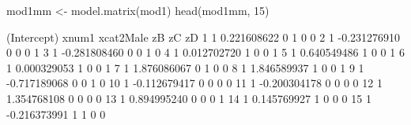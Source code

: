 \begin{Schunk}
\begin{Sinput}
 mod1mm <- model.matrix(mod1)
 head(mod1mm, 15)
\end{Sinput}
\begin{Soutput}
   (Intercept)        xnum1 xcat2Male zB zC zD
1            1  0.221608622         0  1  0  0
2            1 -0.231276910         0  0  0  1
3            1 -0.281808460         0  0  1  0
4            1  0.012702720         1  0  0  1
5            1  0.640549486         1  0  0  1
6            1  0.000329053         1  0  0  1
7            1  1.876086067         0  1  0  0
8            1  1.846589937         1  0  0  1
9            1 -0.717189068         0  0  1  0
10           1 -0.112679417         0  0  0  0
11           1 -0.200304178         0  0  0  0
12           1  1.354768108         0  0  0  0
13           1  0.894995240         0  0  0  1
14           1  0.145769927         1  0  0  0
15           1 -0.216373991         1  1  0  0
\end{Soutput}
\end{Schunk}
